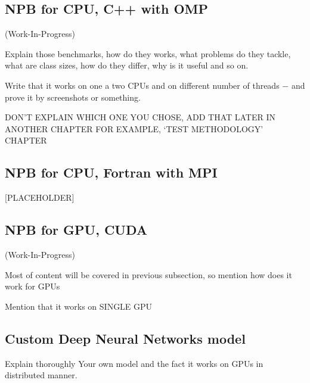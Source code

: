 \subsection{NPB for CPU, C++ with OMP}

(Work-In-Progress)

Explain those benchmarks, how do they works, what problems do they
tackle, what are class sizes, how do they differ, why is it 
useful and so on.

Write that it works on one a two CPUs and on different number of
threads $-$ and prove it by screenshots or something.

DON'T EXPLAIN WHICH ONE YOU CHOSE, ADD THAT LATER IN ANOTHER CHAPTER
FOR EXAMPLE, `TEST METHODOLOGY' CHAPTER

\subsection{NPB for CPU, Fortran with MPI}

[PLACEHOLDER]

\subsection{NPB for GPU, CUDA}

(Work-In-Progress)

Most of content will be covered in previous subsection, so mention
how does it work for GPUs

Mention that it works on SINGLE GPU

\subsection{Custom Deep Neural Networks model}

Explain thoroughly Your own model and the fact it works 
on GPUs in distributed manner.